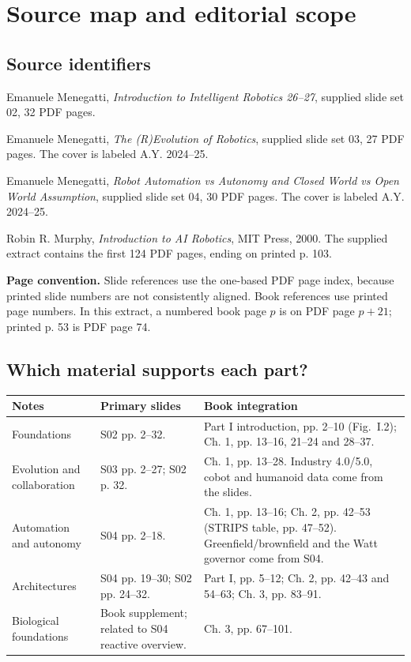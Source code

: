 \section{Source map and editorial scope}
\subsection{Source identifiers}
\begin{description}[leftmargin=12mm,style=nextline]
\item[S02] Emanuele Menegatti, \emph{Introduction to Intelligent Robotics 26--27}, supplied slide set 02, 32 PDF pages.
\item[S03] Emanuele Menegatti, \emph{The (R)Evolution of Robotics}, supplied slide set 03, 27 PDF pages. The cover is labeled A.Y. 2024--25.
\item[S04] Emanuele Menegatti, \emph{Robot Automation vs Autonomy and Closed World vs Open World Assumption}, supplied slide set 04, 30 PDF pages. The cover is labeled A.Y. 2024--25.
\item[Murphy] Robin R. Murphy, \emph{Introduction to AI Robotics}, MIT Press, 2000. The supplied extract contains the first 124 PDF pages, ending on printed p. 103.
\end{description}

\textbf{Page convention.} Slide references use the one-based PDF page index, because printed slide numbers are not consistently aligned. Book references use printed page numbers. In this extract, a numbered book page $p$ is on PDF page $p+21$; printed p. 53 is PDF page 74.

\subsection{Which material supports each part?}
\par\smallskip\begin{tabularx}{\linewidth}{@{}L{34mm}YY@{}}
\toprule
Notes & Primary slides & Book integration \\
\midrule
Foundations & S02 pp. 2--32. & Part I introduction, pp. 2--10 (Fig.~I.2); Ch. 1, pp. 13--16, 21--24 and 28--37. \\
Evolution and collaboration & S03 pp. 2--27; S02 p. 32. & Ch. 1, pp. 13--28. Industry 4.0/5.0, cobot and humanoid data come from the slides. \\
Automation and autonomy & S04 pp. 2--18. & Ch. 1, pp. 13--16; Ch. 2, pp. 42--53 (STRIPS table, pp. 47--52). Greenfield/brownfield and the Watt governor come from S04. \\
Architectures & S04 pp. 19--30; S02 pp. 24--32. & Part I, pp. 5--12; Ch. 2, pp. 42--43 and 54--63; Ch. 3, pp. 83--91. \\
Biological foundations & Book supplement; related to S04 reactive overview. & Ch. 3, pp. 67--101. \\
\bottomrule
\end{tabularx}\par\smallskip

